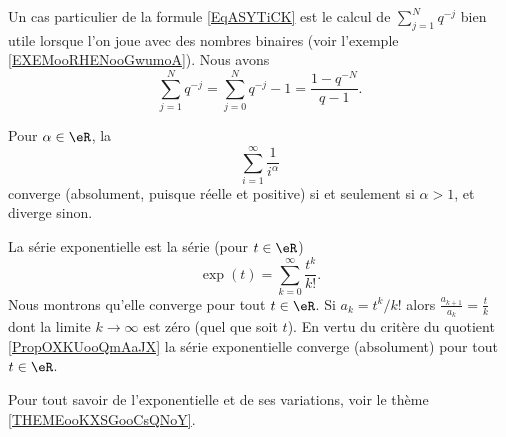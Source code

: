 Un cas particulier de la formule \eqref{EqASYTiCK} est le calcul de \( \sum_{j=1}^{N}q^{-j}\) bien utile lorsque l'on joue avec des nombres binaires (voir l'exemple \ref{EXEMooRHENooGwumoA}). Nous avons
\begin{equation}        \label{EQooFMBAooEJkHWT}
    \sum_{j=1}^Nq^{-j}=\sum_{j=0}^Nq^{-j}-1=\frac{ 1-q^{-N} }{ q-1 }.
\end{equation}

\begin{example}       \label{EXooCTYNooCjYQvJ}
    Pour $\alpha \in \eR$, la 
    \begin{equation}        \label{EqSerRiem}
        \sum_{i=1}^\infty \frac1{i^\alpha}
    \end{equation}
    converge (absolument, puisque réelle et positive) si et seulement si $\alpha > 1$, et diverge sinon.
\end{example}

\begin{example} \label{ExIJMHooOEUKfj}
    La série exponentielle est la série (pour \( t\in \eR\))
    \begin{equation}
        \exp(t)=\sum_{k=0}^{\infty}\frac{ t^k }{ k! }.
    \end{equation}
    Nous montrons qu'elle converge pour tout \( t\in \eR\). Si \( a_k=t^k/k!\) alors \( \frac{ a_{k+1} }{ a_k }=\frac{ t }{ k }\) dont la limite \( k\to \infty\) est zéro (quel que soit \( t\)). En vertu du critère du quotient \ref{PropOXKUooQmAaJX} la série exponentielle converge (absolument) pour tout \( t\in \eR\).

    Pour tout savoir de l'exponentielle et de ses variations, voir le thème \ref{THEMEooKXSGooCsQNoY}.
\end{example}


